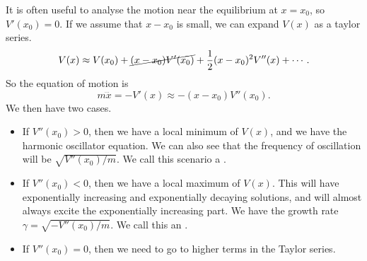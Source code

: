 \documentclass[a4paper]{scrartcl}
\begin{document}
It is often useful to analyse the motion near the equilibrium at $x = x_0$, so $V'(x_0)=0$. If we assume that $x - x_0$ is small, we can expand $V(x)$ as a taylor series.
$$
V(x) \approx V(x_0) + \cancel{(x - x_0)V'(x_0)} + \frac{1}{2}(x - x_0)^2 V''(x) + \cdots.
$$
So the equation of motion is
$$
m \dddot{x} = -V'(x) \approx -(x - x_0)V''(x_0).
$$
We then have two cases.
\begin{itemize}
	\item If $V''(x_0)>0$, then we have a local minimum of $V(x)$, and we have the harmonic oscillator equation. We can also see that the frequency of oscillation will be $\sqrt{V''(x_0)/m}$. We call this scenario a .
	\item If $V''(x_0) < 0$, then we have a local maximum of $V(x)$. 
	This will have exponentially increasing and exponentially decaying solutions, and will almost always excite the exponentially increasing part. We have the growth rate $\gamma = \sqrt{-V''(x_0)/m}$. We call this an .
	\item If $V''(x_0) = 0$, then we need to go to higher terms in the Taylor series.
\end{itemize}
\end{document}
